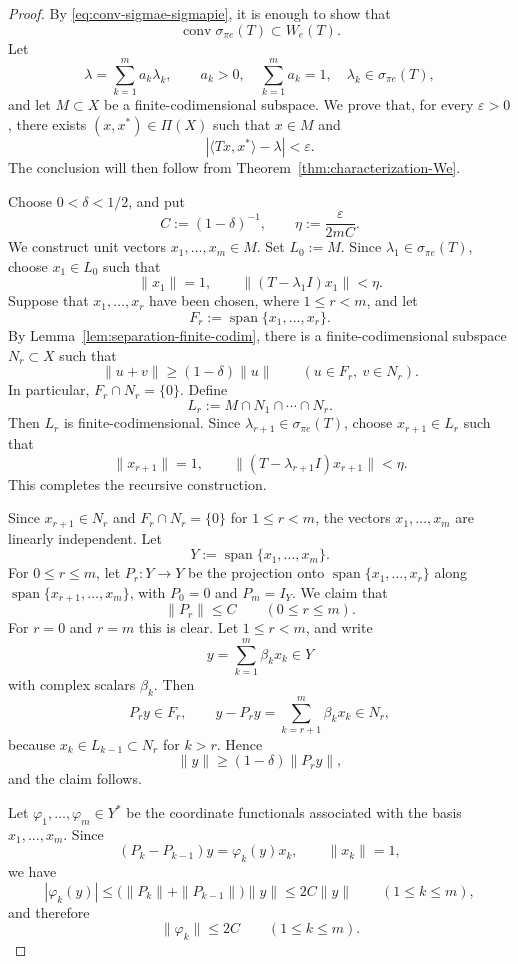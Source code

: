 \documentclass[10pt,a4paper]{amsart}
\begin{document}
\begin{proof}
By \eqref{eq:conv-sigmae-sigmapie}, it is enough to show that
\[
        \operatorname{conv}\sigma_{\pi e}(T)\subset W_e(T).
\]
Let
\[
        \lambda=\sum_{k=1}^m a_k\lambda_k,
        \qquad
        a_k>0,\quad \sum_{k=1}^m a_k=1,\quad
        \lambda_k\in\sigma_{\pi e}(T),
\]
and let \(M\subset X\) be a finite-codimensional subspace. We prove that,
for every \(\varepsilon>0\), there exists \((x,x^*)\in\Pi(X)\) such that
\(x\in M\) and
\[
        |\langle Tx,x^*\rangle-\lambda|<\varepsilon .
\]
The conclusion will then follow from
Theorem~\ref{thm:characterization-We}.

Choose \(0<\delta<1/2\), and put
\[
        C:=(1-\delta)^{-1},
        \qquad
        \eta:=\frac{\varepsilon}{2mC}.
\]
We construct unit vectors \(x_1,\ldots,x_m\in M\). Set \(L_0:=M\). Since
\(\lambda_1\in\sigma_{\pi e}(T)\), choose \(x_1\in L_0\) such that
\[
        \|x_1\|=1,
        \qquad
        \|(T-\lambda_1I)x_1\|<\eta .
\]
Suppose that \(x_1,\ldots,x_r\) have been chosen, where \(1\le r<m\), and
let
\[
        F_r:=\operatorname{span}\{x_1,\ldots,x_r\}.
\]
By Lemma~\ref{lem:separation-finite-codim}, there is a finite-codimensional
subspace \(N_r\subset X\) such that
\[
        \|u+v\|\ge (1-\delta)\|u\|
        \qquad (u\in F_r,\ v\in N_r).
\]
In particular, \(F_r\cap N_r=\{0\}\). Define
\[
        L_r:=M\cap N_1\cap\cdots\cap N_r .
\]
Then \(L_r\) is finite-codimensional. Since
\(\lambda_{r+1}\in\sigma_{\pi e}(T)\), choose \(x_{r+1}\in L_r\) such that
\[
        \|x_{r+1}\|=1,
        \qquad
        \|(T-\lambda_{r+1}I)x_{r+1}\|<\eta .
\]
This completes the recursive construction.

Since \(x_{r+1}\in N_r\) and \(F_r\cap N_r=\{0\}\) for \(1\le r<m\), the
vectors \(x_1,\ldots,x_m\) are linearly independent. Let
\[
        Y:=\operatorname{span}\{x_1,\ldots,x_m\}.
\]
For \(0\le r\le m\), let \(P_r:Y\to Y\) be the projection onto
\(\operatorname{span}\{x_1,\ldots,x_r\}\) along
\(\operatorname{span}\{x_{r+1},\ldots,x_m\}\), with \(P_0=0\) and \(P_m=I_Y\).
We claim that
\[
        \|P_r\|\le C \qquad (0\le r\le m).
\]
For \(r=0\) and \(r=m\) this is clear. Let \(1\le r<m\), and write
\[
        y=\sum_{k=1}^m \beta_kx_k\in Y
\]
with complex scalars \(\beta_k\). Then
\[
        P_ry\in F_r,
        \qquad
        y-P_ry=\sum_{k=r+1}^m \beta_kx_k\in N_r,
\]
because \(x_k\in L_{k-1}\subset N_r\) for \(k>r\). Hence
\[
        \|y\|\ge (1-\delta)\|P_ry\|,
\]
and the claim follows.

Let \(\varphi_1,\ldots,\varphi_m\in Y^*\) be the coordinate functionals
associated with the basis \(x_1,\ldots,x_m\). Since
\[
        (P_k-P_{k-1})y=\varphi_k(y)x_k,
        \qquad \|x_k\|=1,
\]
we have
\[
        |\varphi_k(y)|
        \le
        \bigl(\|P_k\|+\|P_{k-1}\|\bigr)\|y\|
        \le 2C\|y\|
        \qquad (1\le k\le m),
\]
and therefore
\[
        \|\varphi_k\|\le 2C
        \qquad (1\le k\le m).
\]


\end{proof}
\end{document}
